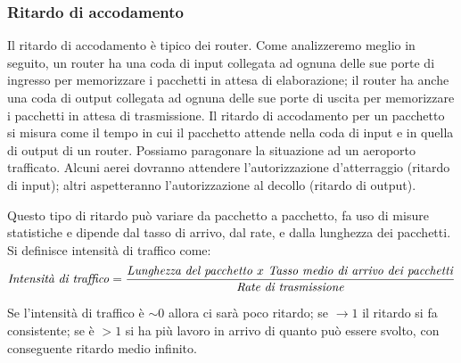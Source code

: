 \subsubsection{Ritardo di accodamento}
Il ritardo di accodamento è tipico dei router. Come analizzeremo meglio in seguito, un router ha una coda di input collegata ad ognuna delle sue porte di ingresso per memorizzare i pacchetti in attesa di elaborazione; il router ha anche una coda di output collegata ad ognuna delle sue porte di uscita per memorizzare i pacchetti in attesa di trasmissione. Il ritardo di accodamento per un pacchetto si misura come il tempo in cui il pacchetto attende nella coda di input e in quella di output di un router. Possiamo paragonare la situazione ad un aeroporto trafficato. Alcuni aerei dovranno attendere l'autorizzazione d'atterraggio (ritardo di input); altri aspetteranno l'autorizzazione al decollo (ritardo di output).

Questo tipo di ritardo può variare da pacchetto a pacchetto, fa uso di misure statistiche e dipende dal tasso di arrivo, dal rate, e dalla lunghezza dei pacchetti. Si definisce intensità di traffico come:
\begin{equation*}
    \text{\textit{Intensità di traffico}} = \frac{\text{\textit{Lunghezza del pacchetto }} x \text{\textit{ Tasso medio di arrivo dei pacchetti}}}{\text{\textit{Rate di trasmissione}}}
\end{equation*}

Se l'intensità di traffico è $\sim 0$ allora ci sarà poco ritardo; se $\to 1$ il ritardo si fa consistente; se è $>1$ si ha più lavoro in arrivo di quanto può essere svolto, con conseguente ritardo medio infinito.

